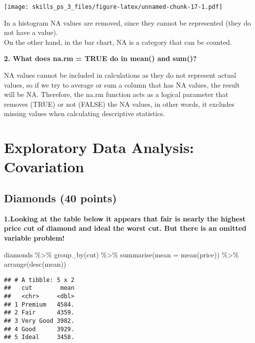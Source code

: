 \documentclass[
]{article}
\newenvironment{Shaded}{\begin{snugshade}}{\end{snugshade}}
\newcommand{\AttributeTok}[1]{\textcolor[rgb]{0.77,0.63,0.00}{#1}}
\newcommand{\FunctionTok}[1]{\textcolor[rgb]{0.00,0.00,0.00}{#1}}
\newcommand{\NormalTok}[1]{#1}
\newcommand{\SpecialCharTok}[1]{\textcolor[rgb]{0.00,0.00,0.00}{#1}}
\begin{document}
\texttt{[image: skills\_ps\_3\_files/figure-latex/unnamed-chunk-17-1.pdf]}

In a histogram NA values are removed, since they cannot be represented
(they do not have a value).\\
On the other hand, in the bar chart, NA is a category that can be
counted.

\textbf{2. What does na.rm = TRUE do in mean() and sum()? }

NA values cannot be included in calculations as they do not represent
actual values, so if we try to average or sum a column that has NA
values, the result will be NA. Therefore, the na.rm function acts as a
logical parameter that removes (TRUE) or not (FALSE) the NA values, in
other words, it excludes missing values when calculating descriptive
statistics.

\pagebreak

\hypertarget{exploratory-data-analysis-covariation}{%
\section{Exploratory Data Analysis:
Covariation}\label{exploratory-data-analysis-covariation}}

\hypertarget{diamonds-40-points}{%
\subsection{Diamonds (40 points)}\label{diamonds-40-points}}

\textbf{1.Looking at the table below it appears that fair is nearly the
highest price cut of diamond and ideal the worst cut. But there is an
omitted variable problem!}

\begin{Shaded}
\begin{Highlighting}[]
\NormalTok{diamonds }\SpecialCharTok{\%\textgreater{}\%}
  \FunctionTok{group\_by}\NormalTok{(cut)  }\SpecialCharTok{\%\textgreater{}\%}
  \FunctionTok{summarise}\NormalTok{(}\AttributeTok{mean =} \FunctionTok{mean}\NormalTok{(price)) }\SpecialCharTok{\%\textgreater{}\%}
  \FunctionTok{arrange}\NormalTok{(}\FunctionTok{desc}\NormalTok{(mean))}
\end{Highlighting}
\end{Shaded}

\begin{verbatim}
## # A tibble: 5 x 2
##   cut        mean
##   <chr>     <dbl>
## 1 Premium   4584.
## 2 Fair      4359.
## 3 Very Good 3982.
## 4 Good      3929.
## 5 Ideal     3458.
\end{verbatim}
\end{document}
